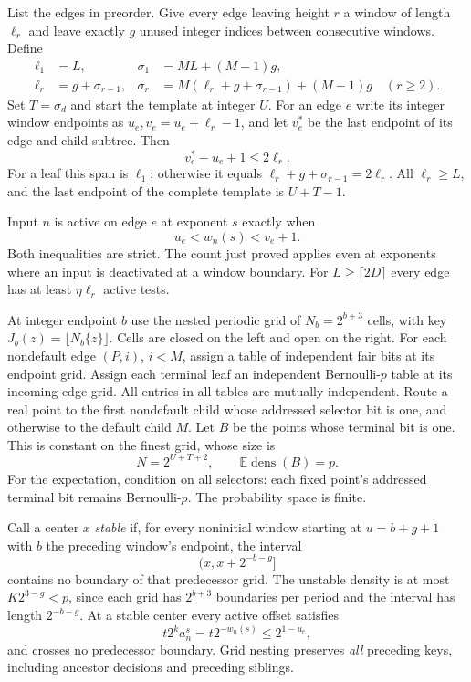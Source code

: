 \documentclass[11pt,letterpaper]{article}
\newcommand{\rhoo}{\operatorname{dens}}
\begin{document}
List the edges in preorder. Give every edge leaving height $r$ a window of
length $\ell_r$ and leave exactly $g$ unused integer indices between consecutive
windows. Define
\begin{align*}
 \ell_1&=L,&\sigma_1&=ML+(M-1)g,\\
 \ell_r&=g+\sigma_{r-1},&
 \sigma_r&=M(\ell_r+g+\sigma_{r-1})+(M-1)g\quad(r\ge2).
\end{align*}
Set $T=\sigma_d$ and start the template at integer $U$. For an edge $e$ write
its integer window endpoints as $u_e,v_e=u_e+\ell_r-1$, and let $v_e^*$ be the
last endpoint of its edge and child subtree. Then
\[
 v_e^*-u_e+1\le2\ell_r.
\]
For a leaf this span is $\ell_1$; otherwise it equals
$\ell_r+g+\sigma_{r-1}=2\ell_r$. All $\ell_r\ge L$, and the last endpoint of
the complete template is $U+T-1$.

Input $n$ is active on edge $e$ at exponent $s$ exactly when
\[
 u_e<w_n(s)<v_e+1.                                    \tag{A}
\]
Both inequalities are strict. The count just proved applies even at exponents
where an input is deactivated at a window boundary. For $L\ge\lceil2D\rceil$
every edge has at least $\eta\ell_r$ active tests.

At integer endpoint $b$ use the nested periodic grid of $N_b=2^{b+3}$ cells,
with key $J_b(z)=\lfloor N_b\{z\}\rfloor$. Cells are closed on the left and
open on the right. For each nondefault edge $(P,i)$, $i<M$, assign a table of
independent fair bits at its endpoint grid. Assign each terminal leaf an
independent Bernoulli-$p$ table at its incoming-edge grid. All entries in all
tables are mutually independent. Route a real point to the first nondefault
child whose addressed selector bit is one, and otherwise to the default child
$M$. Let $B$ be the points whose terminal bit is one. This is constant on the
finest grid, whose size is
\[
 N=2^{U+T+2},\qquad \mathbb E\rhoo(B)=p.
\]
For the expectation, condition on all selectors: each fixed point's addressed
terminal bit remains Bernoulli-$p$. The probability space is finite.

Call a center $x$ \emph{stable} if, for every noninitial window starting at
$u=b+g+1$ with $b$ the preceding window's endpoint, the interval
\[
 (x,x+2^{-b-g}]
\]
contains no boundary of that predecessor grid. The unstable density is at most
$K2^{3-g}<p$, since each grid has $2^{b+3}$ boundaries per period and the
interval has length $2^{-b-g}$. At a stable center every active offset satisfies
\[
 t2^ka_n^s=t2^{-w_n(s)}\le2^{1-u_e},
\]
and crosses no predecessor boundary. Grid nesting preserves \emph{all}
preceding keys, including ancestor decisions and preceding siblings.
\end{document}
